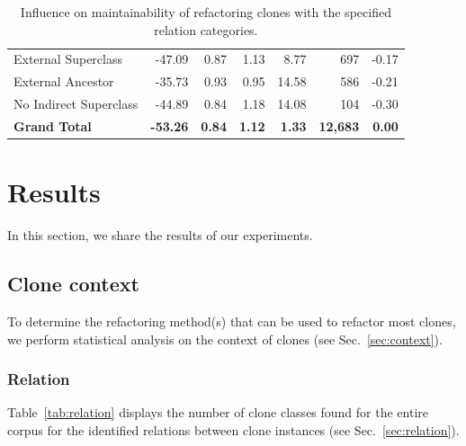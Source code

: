 \documentclass[conference]{IEEEtran}
\begin{document}
\begin{table}
\begin{tabular}{@{}lrrrrrr@{}}
\hspace{10pt} External Superclass & -47.09 & 0.87 & 1.13 & 8.77 & 697 & -0.17 \\
\hspace{10pt} External Ancestor & -35.73 & 0.93 & 0.95 & 14.58 & 586 & -0.21 \\
\hspace{10pt} No Indirect Superclass & -44.89 & 0.84 & 1.18 & 14.08 & 104 & -0.30 \\ \midrule
\textbf{Grand Total} & \textbf{-53.26} & \textbf{0.84} & \textbf{1.12} & \textbf{1.33} & \textbf{12,683} & \textbf{0.00} \\ \bottomrule
\end{tabular}%
\caption{Influence on maintainability of refactoring clones with the specified relation categories.}
\label{tab:relation_refactor}
\end{table}


\section{Results}
In this section, we share the results of our experiments.

\subsection{Clone context}
To determine the refactoring method(s) that can be used to refactor most clones, we perform statistical analysis on the context of clones (see Sec.~\ref{sec:context}).

\subsubsection{Relation}
Table~\ref{tab:relation} displays the number of clone classes found for the entire corpus for the identified relations between clone instances (see Sec.~\ref{sec:relation}).
\end{document}
